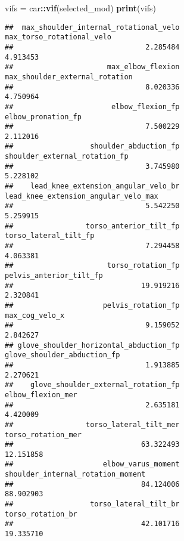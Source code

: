 \documentclass[
]{article}
\newenvironment{Shaded}{\begin{snugshade}}{\end{snugshade}}
\newcommand{\FunctionTok}[1]{\textcolor[rgb]{0.13,0.29,0.53}{\textbf{#1}}}
\newcommand{\NormalTok}[1]{#1}
\newcommand{\OtherTok}[1]{\textcolor[rgb]{0.56,0.35,0.01}{#1}}
\newcommand{\SpecialCharTok}[1]{\textcolor[rgb]{0.81,0.36,0.00}{\textbf{#1}}}
\begin{document}
\begin{Shaded}
\begin{Highlighting}[]
\NormalTok{vifs }\OtherTok{=}\NormalTok{ car}\SpecialCharTok{::}\FunctionTok{vif}\NormalTok{(selected\_mod)}
\FunctionTok{print}\NormalTok{(vifs)}
\end{Highlighting}
\end{Shaded}

\begin{verbatim}
##  max_shoulder_internal_rotational_velo              max_torso_rotational_velo 
##                               2.285484                               4.913453 
##                      max_elbow_flexion         max_shoulder_external_rotation 
##                               8.020336                               4.750964 
##                       elbow_flexion_fp                     elbow_pronation_fp 
##                               7.500229                               2.112016 
##                  shoulder_abduction_fp          shoulder_external_rotation_fp 
##                               3.745980                               5.228102 
##    lead_knee_extension_angular_velo_br   lead_knee_extension_angular_velo_max 
##                               5.542250                               5.259915 
##                 torso_anterior_tilt_fp                  torso_lateral_tilt_fp 
##                               7.294458                               4.063381 
##                      torso_rotation_fp                pelvis_anterior_tilt_fp 
##                              19.919216                               2.320841 
##                     pelvis_rotation_fp                         max_cog_velo_x 
##                               9.159052                               2.842627 
## glove_shoulder_horizontal_abduction_fp            glove_shoulder_abduction_fp 
##                               1.913885                               2.270621 
##    glove_shoulder_external_rotation_fp                      elbow_flexion_mer 
##                               2.635181                               4.420009 
##                 torso_lateral_tilt_mer                     torso_rotation_mer 
##                              63.322493                              12.151858 
##                     elbow_varus_moment      shoulder_internal_rotation_moment 
##                              84.124006                              88.902903 
##                  torso_lateral_tilt_br                      torso_rotation_br 
##                              42.101716                              19.335710 

\end{verbatim}
\end{document}
